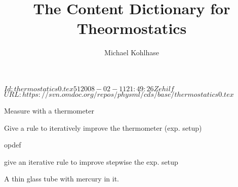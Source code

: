 \documentclass[twoside]{article}
\title{The Content Dictionary for Theormostatics}
\author{Michael Kohlhase}
\begin{document}
\svnInfo $Id: thermostatics0.tex 51 2008-02-11 21:49:26Z ehilf $
\svnKeyword $URL: https://svn.omdoc.org/repos/physml/cds/base/thermostatics0.tex $
\maketitle

\begin{module}[id=thermostatics]

\begin{observable}[name=temparature]
  \begin{opdef}
    Measure with a thermometer
  \end{opdef}
  \begin{refinement}
Give a rule to iteratively improve the thermometer (exp. setup)
  \end{refinement}
\end{observable}

\begin{observable}[name=density]
  \begin{opdef}
    opdef
  \end{opdef}
  \begin{refinement}
    give an iterative rule to improve stepwise the exp. setup
  \end{refinement}
\end{observable}

\begin{system}[id=mercury-thermometer]
  \begin{realization}
    A thin glass tube with mercury in it.
  \end{realization}
\end{system}


\end{module}
\end{document}
